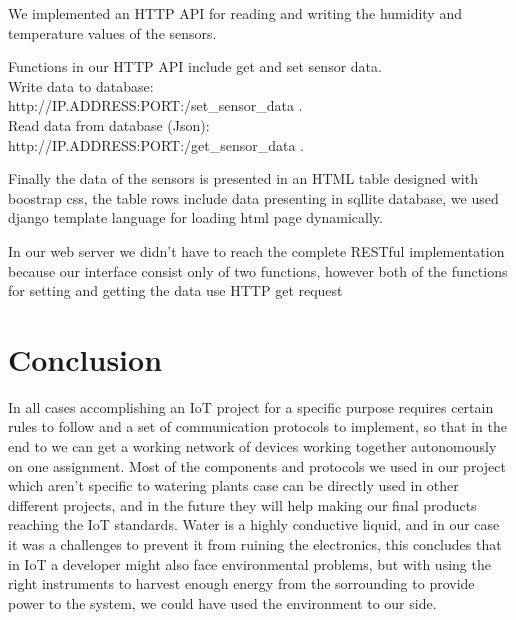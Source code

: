\documentclass[11pt,paper=a4,parskip=half]{scrartcl}
\begin{document}
We implemented an HTTP API for reading and writing the humidity and temperature values of the sensors.
 
Functions in our HTTP API include get and set sensor data.\\

Write data to database:
\\ http://IP.ADDRESS:PORT:/set\_sensor\_data . \\

Read data from database (Json):
\\ http://IP.ADDRESS:PORT:/get\_sensor\_data .

Finally the data of the sensors is presented in an HTML table designed with boostrap css, the table rows include data presenting in sqllite database, we used django template language for loading html page dynamically.

In our web server we didn't have to reach the complete RESTful implementation because our interface consist only of two functions, however both of the functions for setting and getting the data use HTTP get request

\section{Conclusion}

In all cases accomplishing an IoT project for a specific purpose requires certain rules to follow and a set of communication protocols to implement, so that in the end to we can get a working network of devices working together autonomously on one assignment. Most of the components and protocols we used in our project which aren't specific to watering plants case can be directly used in other different projects, and in the future they will help making our final products reaching the IoT standards. Water is a highly conductive liquid, and in our case it was a challenges to prevent it from ruining the electronics, this concludes that in IoT a developer might also face environmental problems, but with using the right instruments to harvest enough energy from the sorrounding to provide power to the system, we could have used the environment to our side.

\newpage
\nocite{*}


\end{document}
